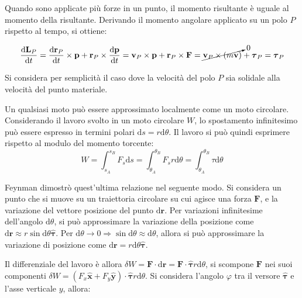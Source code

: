\documentclass{article}
\newcommand{\vect}[1]{\boldsymbol{\mathbf{#1}}}
\newcommand{\df}{\mathrm{d}}
\numberwithin{equation}{subsection}
\begin{document}
Quando sono applicate più forze in un punto, il momento risultante è uguale al momento della risultante. 
Derivando il momento angolare applicato su un polo $P$ rispetto al tempo, si ottiene: 

\begin{equation}
    \displaystyle\frac{\df\vect{L}_P}{\df t}=\frac{\df\vect{r}_P}{\df t}\times\vect{p}+\vect{r}_P\times\frac{\df\vect{p}}{\df t}=\vect{v}_P\times\vect{p}+\vect{r}_P\times\vect{F}=\cancelto{0}{\vect{v}_P\times(m\vect{v})}+\vect{\tau}_P=\vect{\tau}_P
\end{equation}

Si considera per semplicità il caso dove la velocità del polo $P$ sia solidale alla velocità del punto materiale. 


Un qualsiasi moto può essere approssimato localmente come un moto circolare. Considerando il lavoro svolto in un moto circolare $W$, lo spostamento infinitesimo può essere espresso 
in termini polari $\df s=r\df\theta$. Il lavoro si può quindi esprimere rispetto al modulo del momento torcente: 
\begin{equation*}
    W=\displaystyle\int_{s_A}^{s_B}{F}_s \df s=\int_{\theta_A}^{\theta_B}F_sr\df\theta=\int_{\theta_A}^{\theta_B}\tau \df\theta
\end{equation*}




Feynman dimostrò quest'ultima relazione nel seguente modo. Si considera un punto che si 
muove su un traiettoria circolare su cui agisce una forza $\vect{F}$, 
e la variazione del vettore posizione del punto $\df\vect{r}$. Per 
variazioni infinitesime dell'angolo $\df\theta$, si può approssimare la variazione 
della posizione come $\df\vect{r}\approx r\sin \df\theta\hat{\vect{\tau}}$. Per 
$\df\theta\to 0\Rightarrow \sin \df\theta\approx \df\theta$, allora si può 
approssimare la variazione di posizione come $\df\vect{r}=r\df\theta\hat{\vect{\tau}}$. 


Il differenziale del lavoro è allora $\delta W =\vect{F}\cdot \df\vect{r}=\vect{F}\cdot\hat{\vect{\tau}}r\df\theta$, 
si scompone $\vect{F}$ nei suoi componenti $\delta W=(F_x\hat{\vect{x}}+F_y\hat{\vect{y}})\cdot\hat{\vect{\tau}}r\df\theta$. 
Si considera l'angolo $\varphi$ tra il versore $\hat{\vect{\tau}}$ e l'asse 
verticale $y$, allora: 
\end{document}
